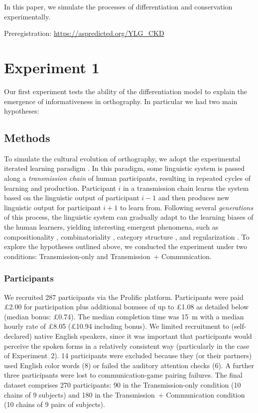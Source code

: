 \documentclass[doc,biblatex]{apa7}
\begin{document}
In this paper, we simulate the processes of differentiation and conservation experimentally.

Preregistration: \url{https://aspredicted.org/YLG_CKD}


\section{Experiment 1}

Our first experiment tests the ability of the differentiation model to explain the emergence of informativeness in orthography. In particular we had two main hypotheses:

\subsection{Methods}

To simulate the cultural evolution of orthography, we adopt the experimental iterated learning paradigm \parencite{Kirby:2008, Kirby:2015}. In this paradigm, some linguistic system is passed along a \textit{transmission chain} of human participants, resulting in repeated cycles of learning and production. Participant $i$ in a transmission chain learns the system based on the linguistic output of participant $i-1$ and then produces new linguistic output for participant $i+1$ to learn from. Following several \textit{generations} of this process, the linguistic system can gradually adapt to the learning biases of the human learners, yielding interesting emergent phenomena, such as compositionality \parencite{Kirby:2008, Kirby:2015}, combinatoriality \parencite{Verhoef:2015}, category structure \parencite{Carr:2017, Carr:2020}, and regularization \parencite{Smith:2010, Ferdinand:2019}. To explore the hypotheses outlined above, we conducted the experiment under two conditions: Transmission-only and Transmission~+ Communication.

\subsubsection{Participants}

We recruited 287 participants via the Prolific platform. Participants were paid £2.00 for participation plus additional bonuses of up to £1.08 as detailed below (median bonus: £0.74). The median completion time was 15~m with a median hourly rate of £8.05 (£10.94 including bonus). We limited recruitment to (self-declared) native English speakers, since it was important that participants would perceive the spoken forms in a relatively consistent way (particularly in the case of Experiment~2). 14 participants were excluded because they (or their partners) used English color words (8) or failed the auditory attention checks (6). A further three participants were lost to communication-game pairing failures. The final dataset comprises 270 participants: 90 in the Transmission-only condition (10 chains of 9 subjects) and 180 in the Transmission~+ Communication condition (10 chains of 9 pairs of subjects).
\end{document}
